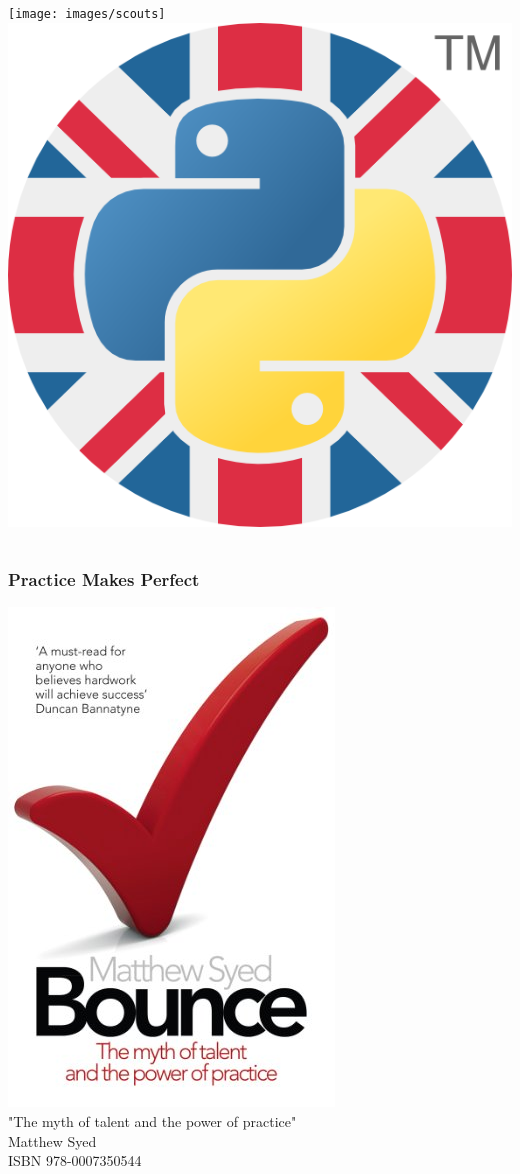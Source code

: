 
\begin{frame}
    \begin{columns}
            \texttt{[image: images/scouts]}\\[2em]
            \includegraphics[scale=0.8]{images/ukpa}
    \end{columns}
\end{frame}

\begin{frame}[t]\frametitle{Practice Makes Perfect}
    \begin{center}
        \includegraphics[scale=0.2]{images/bounce}\\[2em]
            "The myth of talent and the power of practice"\\[2em]
            Matthew Syed\\
            ISBN 978-0007350544\\
    \end{center}
\end{frame}
